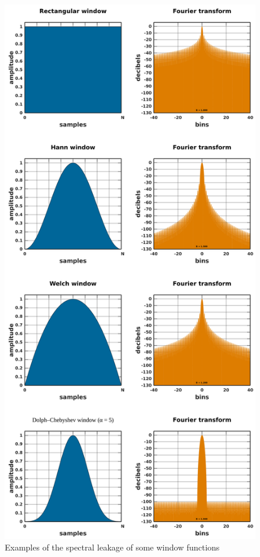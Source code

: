 \documentclass[10pt,twocolumn]{article}
\begin{document}
\begin{figure}[H]
    \centering
    \includegraphics[width=\linewidth]{fig/windows.png}
    \caption{Examples of the spectral leakage of some window functions}
    \label{fig:windowfunceffect}
\end{figure}
\end{document}
